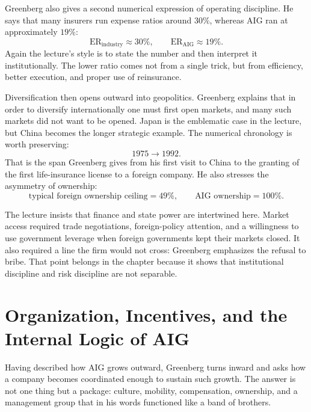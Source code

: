 Greenberg also gives a second numerical expression of operating discipline. He says that many insurers run expense ratios around \(30\%\), whereas AIG ran at approximately \(19\%\):
\begin{equation}
\mathrm{ER}_{\text{industry}} \approx 30\%,
\qquad
\mathrm{ER}_{\text{AIG}} \approx 19\%.
\end{equation}
Again the lecture's style is to state the number and then interpret it institutionally. The lower ratio comes not from a single trick, but from efficiency, better execution, and proper use of reinsurance.

Diversification then opens outward into geopolitics. Greenberg explains that in order to diversify internationally one must first open markets, and many such markets did not want to be opened. Japan is the emblematic case in the lecture, but China becomes the longer strategic example. The numerical chronology is worth preserving:
\begin{equation}
1975 \longrightarrow 1992.
\end{equation}
That is the span Greenberg gives from his first visit to China to the granting of the first life-insurance license to a foreign company. He also stresses the asymmetry of ownership:
\begin{equation}
\text{typical foreign ownership ceiling} = 49\%,
\qquad
\text{AIG ownership} = 100\%.
\end{equation}

The lecture insists that finance and state power are intertwined here. Market access required trade negotiations, foreign-policy attention, and a willingness to use government leverage when foreign governments kept their markets closed. It also required a line the firm would not cross: Greenberg emphasizes the refusal to bribe. That point belongs in the chapter because it shows that institutional discipline and risk discipline are not separable.

\section{Organization, Incentives, and the Internal Logic of AIG}

Having described how AIG grows outward, Greenberg turns inward and asks how a company becomes coordinated enough to sustain such growth. The answer is not one thing but a package: culture, mobility, compensation, ownership, and a management group that in his words functioned like a band of brothers.

